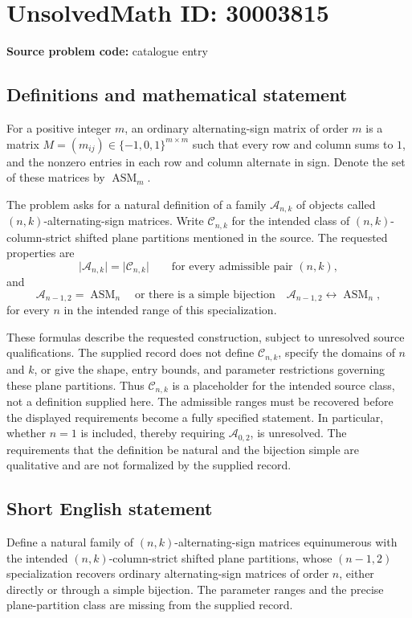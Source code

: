 \documentclass[11pt]{article}
\begin{document}
\section*{UnsolvedMath ID: 30003815}
\textbf{Source problem code:} catalogue entry
\subsection{Definitions and mathematical statement}
For a positive integer \(m\), an ordinary alternating-sign matrix of order \(m\) is a matrix \(M=(m_{ij})\in\{-1,0,1\}^{m\times m}\) such that every row and column sums to \(1\), and the nonzero entries in each row and column alternate in sign. Denote the set of these matrices by \(\operatorname{ASM}_m\).

The problem asks for a natural definition of a family \(\mathcal A_{n,k}\) of objects called \((n,k)\)-alternating-sign matrices. Write \(\mathcal C_{n,k}\) for the intended class of \((n,k)\)-column-strict shifted plane partitions mentioned in the source. The requested properties are
\[
\lvert\mathcal A_{n,k}\rvert=\lvert\mathcal C_{n,k}\rvert
\qquad\text{for every admissible pair }(n,k),
\]
and
\[
\mathcal A_{n-1,2}=\operatorname{ASM}_n
\quad\text{or there is a simple bijection}\quad
\mathcal A_{n-1,2}\longleftrightarrow\operatorname{ASM}_n,
\]
for every \(n\) in the intended range of this specialization.

These formulas describe the requested construction, subject to unresolved source qualifications. The supplied record does not define \(\mathcal C_{n,k}\), specify the domains of \(n\) and \(k\), or give the shape, entry bounds, and parameter restrictions governing these plane partitions. Thus \(\mathcal C_{n,k}\) is a placeholder for the intended source class, not a definition supplied here. The admissible ranges must be recovered before the displayed requirements become a fully specified statement. In particular, whether \(n=1\) is included, thereby requiring \(\mathcal A_{0,2}\), is unresolved. The requirements that the definition be natural and the bijection simple are qualitative and are not formalized by the supplied record.
\subsection{Short English statement}
Define a natural family of \((n,k)\)-alternating-sign matrices equinumerous with the intended \((n,k)\)-column-strict shifted plane partitions, whose \((n-1,2)\) specialization recovers ordinary alternating-sign matrices of order \(n\), either directly or through a simple bijection. The parameter ranges and the precise plane-partition class are missing from the supplied record.
\end{document}
